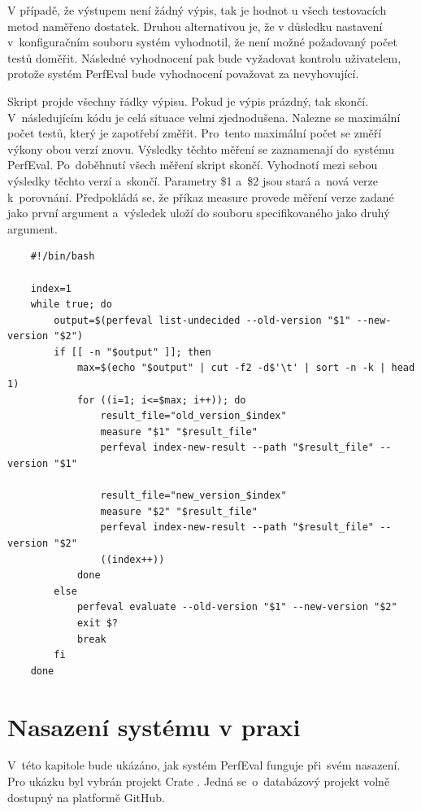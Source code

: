 V případě, že výstupem není žádný výpis, tak je hodnot u všech testovacích metod naměřeno dostatek. Druhou alternativou
je, že v důsledku nastavení v~konfiguračním souboru systém vyhodnotil, že není možné požadovaný
počet testů doměřit. Následné vyhodnocení pak bude vyžadovat kontrolu uživatelem, protože
systém PerfEval bude vyhodnocení považovat za nevyhovující.

Skript projde všechny řádky výpisu. Pokud je výpis prázdný, tak skončí.
V~následujícím kódu je celá situace velmi zjednodušena. Nalezne se maximální počet
testů, který je zapotřebí změřit. Pro~tento maximální počet se změří výkony obou verzí znovu. Výsledky těchto měření
se zaznamenají do~systému PerfEval. Po~doběhnutí všech měření skript skončí. Vyhodnotí mezi sebou výsledky těchto
verzí a~skončí. Parametry \$1 a~\$2 jsou stará a~nová verze k~porovnání. Předpokládá se, že
příkaz measure provede měření verze zadané jako první argument a~výsledek uloží do souboru specifikovaného jako druhý argument.

\begin{lstlisting}
    #!/bin/bash

    index=1
    while true; do
        output=$(perfeval list-undecided --old-version "$1" --new-version "$2")
        if [[ -n "$output" ]]; then
            max=$(echo "$output" | cut -f2 -d$'\t' | sort -n -k | head 1)
            for ((i=1; i<=$max; i++)); do
                result_file="old_version_$index"
                measure "$1" "$result_file"
                perfeval index-new-result --path "$result_file" --version "$1"

                result_file="new_version_$index"
                measure "$2" "$result_file"
                perfeval index-new-result --path "$result_file" --version "$2"
                ((index++))
            done
        else
            perfeval evaluate --old-version "$1" --new-version "$2"
            exit $?
            break
        fi
    done

\end{lstlisting}

\section{Nasazení systému v praxi}

V~této kapitole bude ukázáno, jak systém PerfEval funguje při~svém nasazení.
Pro ukázku byl vybrán projekt Crate \cite{crateDB}. Jedná se~o~databázový projekt
volně dostupný na platformě GitHub.

